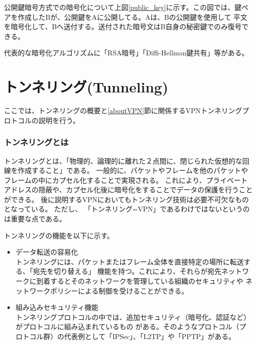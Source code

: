 \documentclass[11pt,a4j,titlepage]{jreport}
\begin{document}
公開鍵暗号方式での暗号化について上図\ref{public_key}に示す。この図では、鍵ペアを作成したBが、公開鍵をAに公開してる。Aは、Bの公開鍵を使用して
平文を暗号化して、Bへ送付する。送付された暗号文はB自身の秘密鍵でのみ復号できる。


代表的な暗号化アルゴリズムに「RSA暗号」「Diffi-Hellman鍵共有」等がある。

\section{トンネリング(Tunneling)}\label{Tunnel}
ここでは、トンネリングの概要と\ref{aboutVPN}節に関係するVPNトンネリングプロトコルの説明を行う。

\subsubsection*{トンネリングとは}
トンネリングとは、「物理的、論理的に離れた２点間に、閉じられた仮想的な回線を作成すること」である。
一般的に、パケットやフレームを他のパケットやフレームの中にカプセル化することで実現される。
これにより、プライベートアドレスの隠蔽や、カプセル化後に暗号化をすることでデータの保護を行うことができる。
後に説明するVPNにおいてもトンネリング技術は必要不可欠なものとなっている。
ただし、
「トンネリング=VPN」であるわけではないというのは重要な点である。

\par トンネリングの機能を以下に示す。
\begin{itemize}
    \item データ転送の容易化 \mbox{}\\
    トンネリングには、パケットまたはフレーム全体を直接特定の場所に転送する、「宛先を切り替える」
    機能を持つ。これにより、それらが宛先ネットワークに到着するとそのネットワークを管理している組織のセキュリティや
    ネットワークポリシーによる制御を受けることができる。
    \item 組み込みセキュリティ機能\mbox{}\\
    トンネリングプロトコルの中では、追加セキュリティ（暗号化、認証など）がプロトコルに組み込まれているもの
    がある。そのようなプロトコル（プロトコル群）の代表例として「IPSec」、「L2TP」や「PPTP」がある。
\end{itemize}
\end{document}
